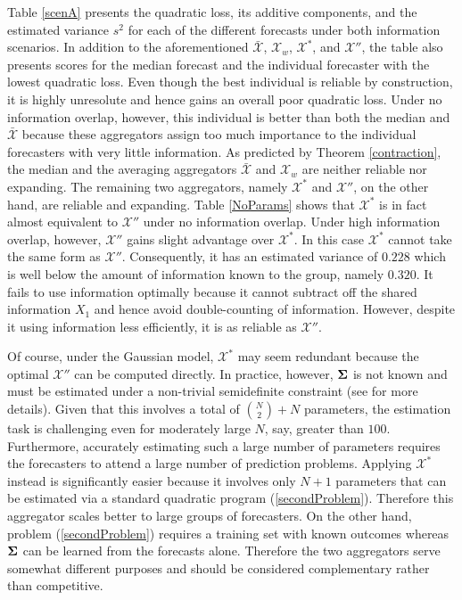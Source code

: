 \documentclass[12pt]{article}
\theoremstyle{definition}
\theoremstyle{definition}
\def\bSigma{{\bf \Sigma}}
\begin{document}
Table \ref{scenA} presents the quadratic loss, its additive components, and the estimated variance $s^2$ for each of the different forecasts under both information scenarios. In addition to the aforementioned $\bar{\mathcal{X}}$, $\mathcal{X}_w$, $\mathcal{X}^*$, and $\mathcal{X}''$, the table also presents scores for the median forecast and the individual forecaster with the lowest quadratic loss. Even though the best individual is reliable by construction, it is highly unresolute and hence gains an overall poor quadratic loss. 
%
 Under no information overlap, however, this individual is better than both the median and $\bar{\mathcal{X}}$ because these aggregators assign too much importance to the individual forecasters with very little information.  As predicted by Theorem \ref{contraction},  the median and the averaging aggregators $\bar{\mathcal{X}}$ and $\mathcal{X}_w$ are neither reliable nor expanding. The remaining two aggregators, namely $\mathcal{X}^*$ and $\mathcal{X}''$, on the other hand, are reliable and expanding. Table \ref{NoParams} shows that $\mathcal{X}^*$ is in fact  almost equivalent to $\mathcal{X}''$ under no information overlap. Under high information overlap, however, $\mathcal{X}''$ gains slight advantage over $\mathcal{X}^*$. In this case $\mathcal{X}^*$ cannot take the same form as $\mathcal{X}''$. Consequently, it has an estimated variance of $0.228$ which is well below the  amount of information known to the group, namely $0.320$. It fails to use information optimally because it cannot subtract off the shared information $X_1$ and hence avoid double-counting of information. However, despite it using information less efficiently, it is as reliable as $\mathcal{X}''$. 

Of course, under the Gaussian model, $\mathcal{X}^*$ may seem redundant because the optimal  $\mathcal{X}''$ can be computed directly. In practice, however, $\bSigma$ is not known and must be estimated under a non-trivial semidefinite constraint (see \citealt{satopaamodeling2} for more details). Given that this involves a total of $\binom{N}{2} + N$ parameters, the estimation task is challenging even for moderately large $N$, say, greater than $100$. Furthermore, accurately estimating such a large number of parameters requires the forecasters to attend a large number of prediction problems. Applying $\mathcal{X}^*$ instead is significantly easier because it involves only $N+1$ parameters that can be estimated via a standard quadratic program (\ref{secondProblem}).  Therefore this aggregator scales better to large groups of forecasters. On the other hand, problem (\ref{secondProblem}) requires a training set with known outcomes whereas $\bSigma$ can be learned from the forecasts alone. Therefore the two aggregators serve somewhat different purposes and should be considered complementary rather than competitive.
\end{document}

